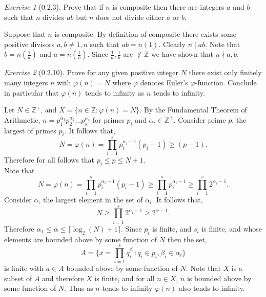 \documentclass[12pt]{amsart}
\makeatletter
\theoremstyle{remark}
\newtheorem*{exercise}{Exercise}%
\def\ZZ{\ensuremath{\mathbb Z}}
\renewenvironment{proof}[1][\proofname]{\par\doublespacing
  \pushQED{\qed}%
  \normalfont \topsep6\p@\@plus6\p@\relax
  \list{}{%
    \settowidth{\leftmargin}{\itshape\proofname:\hskip\labelsep}%
    \setlength{\labelwidth}{0pt}%
    \setlength{\itemindent}{-\leftmargin}%
  }%
  \item[\hskip\labelsep\itshape#1\@addpunct{:}]\ignorespaces
}{%
  \popQED\endlist\@endpefalse
  \singlespacing
}
\theoremstyle{mycomment}
\makeatother
\begin{document}
\thispagestyle{fancy}
\author{Coordinator: Coordinator's Name}


    

\begin{exercise}[0.2.3] Prove that if $n$ is composite then there are integers $a$ and $b$ such that $n$ divides $ab$ but $n$ does not divide either $a$ or $b$.
    \begin{proof} Suppose that $n$ is composite. By definition of composite there exists some positive divisors $a,b \neq 1, n$ such that $ab = n(1)$.
      Clearly $n \mid ab$. Note that $b = n(\frac{1}{a})$ and $a = n(\frac{1}{b})$.
      Since $\frac{1}{a}, \frac{1}{b}$ are $\notin \ZZ$ we have shown that $n \nmid a,b$.
    \end{proof}
    \end{exercise}

\begin{exercise}[0.2.10] Prove for any given positive integer $N$ there exist only finitely many integers $n$ 
    with $\varphi(n) = N$ where $\varphi$ denotes Euler's $\varphi$-function. Conclude in particular that 
    $\varphi(n)$ tends to infinity as $n$ tends to infinity.
    \begin{proof} 
        Let $N \in \ZZ^{+}$, and $X = \{n \in \ZZ: \varphi(n) = N\}$. By the Fundamental Theorem of Arithmetic, $n = p_1^{\alpha_1}p_2^{\alpha_2} \dots p_s^{\alpha_s}$
        for primes $p_i$ and $\alpha_i \in \ZZ^+$. Consider prime $p$, the largest of primes $p_i$. It follows that, 
        \begin{equation*}
        N = \varphi(n) = \prod_{i = 1}^s p_i^{\alpha_i - 1}(p_i - 1) \geq (p - 1).
        \end{equation*}
        Therefore for all follows that $p_i \leq p \leq N+1$.\\

        Note that
        \begin{equation*}
        N = \varphi(n) = \prod_{i = 1}^s p_i^{\alpha_i - 1}(p_i - 1) \geq \prod_{i = 1}^s p_i^{\alpha_i - 1} \geq \prod_{i = 1}^s 2^{\alpha_i - 1}. 
        \end{equation*}
        Consider $\alpha$, the largest element in the set of $\alpha_i$. It follows that, 
        \begin{equation*}
        N \geq \prod_{i = 1}^s 2^{\alpha_i - 1} \geq 2^{\alpha - 1}.
        \end{equation*}
        Therefore $\alpha_1 \leq \alpha \leq \lceil\log_2(N) + 1\rceil$.
        Since $p_i$ is finite, and $s_i$ is finite, and whose elements are bounded above by some function of $N$ then the set,
        \begin{equation*}
        A  = \{x = \prod_{i = 1}^s q_{i}^{\beta_i}: q_i \in p_i, \beta_i \in \alpha_i\}
        \end{equation*} 
        is finite with $a \in A$ bounded above by some function of $N$. 
        Note that $X$ is a subset of $A$ and therefore $X$ is finite, and for all $n \in X$, $n$ is bounded above by some function of $N$. Thus as $n$ tends to infinity $\varphi(n)$ also tends to infinity.  
    \end{proof}
\end{exercise}
\end{document}
